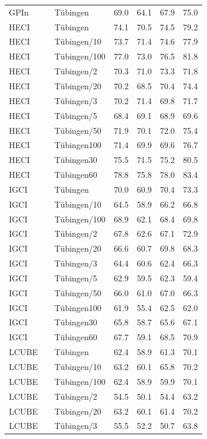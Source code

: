 \begin{tabular}{lllllll}
GPIn &  & Tübingen & 69.0 & 64.1 & 67.9 & 75.0 \\
HECI &  & Tübingen & 74.1 & 70.5 & 74.5 & 79.2 \\
HECI &  & Tübingen/10 & 73.7 & 71.4 & 74.6 & 77.9 \\
HECI &  & Tübingen/100 & 77.0 & 73.0 & 76.5 & 81.8 \\
HECI &  & Tübingen/2 & 70.3 & 71.0 & 73.3 & 71.8 \\
HECI &  & Tübingen/20 & 70.2 & 68.5 & 70.4 & 74.4 \\
HECI &  & Tübingen/3 & 70.2 & 71.4 & 69.8 & 71.7 \\
HECI &  & Tübingen/5 & 68.4 & 69.1 & 68.9 & 69.6 \\
HECI &  & Tübingen/50 & 71.9 & 70.1 & 72.0 & 75.4 \\
HECI &  & Tübingen100 & 71.4 & 69.9 & 69.6 & 76.7 \\
HECI &  & Tübingen30 & 75.5 & 71.5 & 75.2 & 80.5 \\
HECI &  & Tübingen60 & 78.8 & 75.8 & 78.0 & 83.4 \\
IGCI &  & Tübingen & 70.0 & 60.9 & 70.4 & 73.3 \\
IGCI &  & Tübingen/10 & 64.5 & 58.9 & 66.2 & 66.8 \\
IGCI &  & Tübingen/100 & 68.9 & 62.1 & 68.4 & 69.8 \\
IGCI &  & Tübingen/2 & 67.8 & 62.6 & 67.1 & 72.9 \\
IGCI &  & Tübingen/20 & 66.6 & 60.7 & 69.8 & 68.3 \\
IGCI &  & Tübingen/3 & 64.4 & 60.6 & 62.4 & 66.3 \\
IGCI &  & Tübingen/5 & 62.9 & 59.5 & 62.3 & 59.4 \\
IGCI &  & Tübingen/50 & 66.0 & 61.0 & 67.0 & 66.3 \\
IGCI &  & Tübingen100 & 61.9 & 55.4 & 62.5 & 62.0 \\
IGCI &  & Tübingen30 & 65.8 & 58.7 & 65.6 & 67.1 \\
IGCI &  & Tübingen60 & 67.7 & 59.1 & 68.5 & 70.9 \\
LCUBE &  & Tübingen & 62.4 & 58.9 & 61.3 & 70.1 \\
LCUBE &  & Tübingen/10 & 63.2 & 60.1 & 65.8 & 70.2 \\
LCUBE &  & Tübingen/100 & 62.4 & 58.9 & 59.9 & 70.1 \\
LCUBE &  & Tübingen/2 & 54.5 & 50.1 & 54.4 & 63.2 \\
LCUBE &  & Tübingen/20 & 63.2 & 60.1 & 61.4 & 70.2 \\
LCUBE &  & Tübingen/3 & 55.5 & 52.2 & 50.7 & 63.8 \\

\end{tabular}
